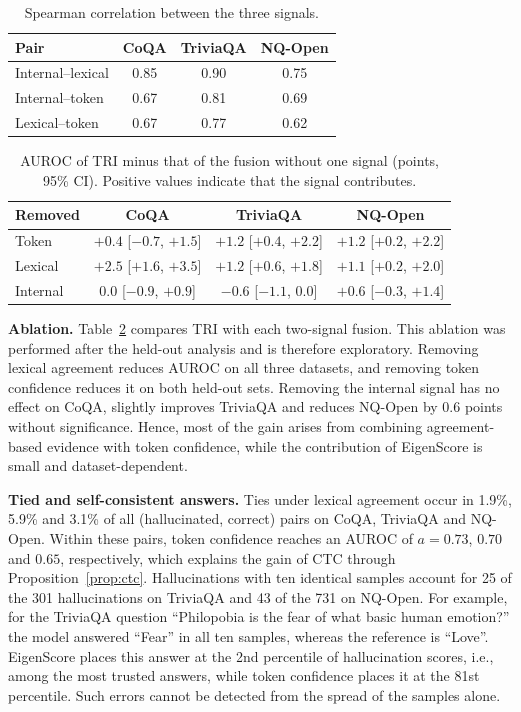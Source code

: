 \documentclass[conference]{IEEEtran}
\begin{document}
\begin{table}[t]
\centering
\caption{Spearman correlation between the three signals.}
\label{tab:rho}
\footnotesize
\setlength{\tabcolsep}{3.5pt}
\small
\begin{tabular}{@{}lccc@{}}
\toprule
Pair & CoQA & TriviaQA & NQ-Open \\
\midrule
Internal--lexical & 0.85 & 0.90 & 0.75 \\
Internal--token & 0.67 & 0.81 & 0.69 \\
Lexical--token & 0.67 & 0.77 & 0.62 \\
\bottomrule
\end{tabular}
\end{table}

\begin{table}[t]
\centering
\caption{AUROC of TRI minus that of the fusion without one signal (points, 95\% CI). Positive values indicate that the signal contributes.}
\label{tab:ablation}
\small
\begin{tabular}{@{}lccc@{}}
\toprule
Removed & CoQA & TriviaQA & NQ-Open \\
\midrule
Token & $+0.4$ [$-0.7$, $+1.5$] & $+1.2$ [$+0.4$, $+2.2$] & $+1.2$ [$+0.2$, $+2.2$] \\
Lexical & $+2.5$ [$+1.6$, $+3.5$] & $+1.2$ [$+0.6$, $+1.8$] & $+1.1$ [$+0.2$, $+2.0$] \\
Internal & $0.0$ [$-0.9$, $+0.9$] & $-0.6$ [$-1.1$, $0.0$] & $+0.6$ [$-0.3$, $+1.4$] \\
\bottomrule
\end{tabular}
\end{table}

\textbf{Ablation.} Table~\ref{tab:ablation} compares TRI with each two-signal fusion. This ablation was performed after the held-out analysis and is therefore exploratory. Removing lexical agreement reduces AUROC on all three datasets, and removing token confidence reduces it on both held-out sets. Removing the internal signal has no effect on CoQA, slightly improves TriviaQA and reduces NQ-Open by 0.6 points without significance. Hence, most of the gain arises from combining agreement-based evidence with token confidence, while the contribution of EigenScore is small and dataset-dependent.

\textbf{Tied and self-consistent answers.} Ties under lexical agreement occur in 1.9\%, 5.9\% and 3.1\% of all (hallucinated, correct) pairs on CoQA, TriviaQA and NQ-Open. Within these pairs, token confidence reaches an AUROC of $a=0.73$, $0.70$ and $0.65$, respectively, which explains the gain of CTC through Proposition~\ref{prop:ctc}. Hallucinations with ten identical samples account for 25 of the 301 hallucinations on TriviaQA and 43 of the 731 on NQ-Open. For example, for the TriviaQA question ``Philopobia is the fear of what basic human emotion?'' the model answered ``Fear'' in all ten samples, whereas the reference is ``Love''. EigenScore places this answer at the 2nd percentile of hallucination scores, i.e., among the most trusted answers, while token confidence places it at the 81st percentile. Such errors cannot be detected from the spread of the samples alone.
\end{document}
